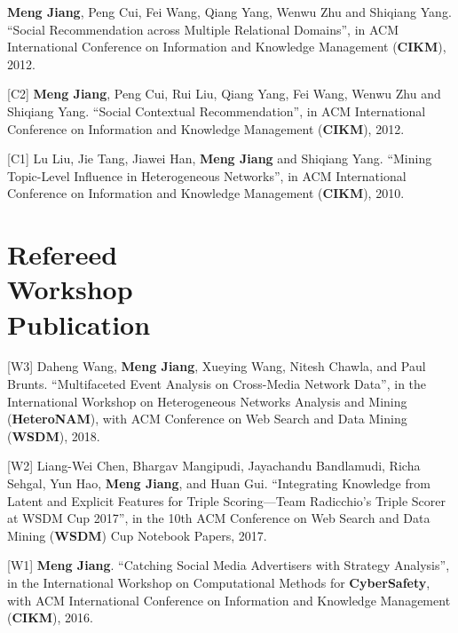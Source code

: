 \documentclass[margin, 9pt]{res}
\begin{document}
\begin{resume}
[C3] \textbf{Meng Jiang}, Peng Cui, Fei Wang, Qiang Yang, Wenwu Zhu and Shiqiang Yang. ``Social Recommendation across Multiple Relational Domains'', in ACM International Conference on Information and Knowledge Management (\textbf{CIKM}), 2012.

[C2] \textbf{Meng Jiang}, Peng Cui, Rui Liu, Qiang Yang, Fei Wang, Wenwu Zhu and Shiqiang Yang. ``Social Contextual Recommendation'', in ACM International Conference on Information and Knowledge Management (\textbf{CIKM}), 2012.

[C1] Lu Liu, Jie Tang, Jiawei Han, \textbf{Meng Jiang} and Shiqiang Yang. ``Mining Topic-Level Influence in Heterogeneous Networks'', in ACM International Conference on Information and Knowledge Management (\textbf{CIKM}), 2010.


\section{Refereed \\ Workshop \\ Publication}

[W3] Daheng Wang, \textbf{Meng Jiang}, Xueying Wang, Nitesh Chawla, and Paul Brunts. ``Multifaceted Event Analysis on Cross-Media Network Data'', in the International Workshop on Heterogeneous Networks Analysis and Mining (\textbf{HeteroNAM}), with ACM Conference on Web Search and Data Mining (\textbf{WSDM}), 2018.

[W2] Liang-Wei Chen, Bhargav Mangipudi, Jayachandu Bandlamudi, Richa Sehgal, Yun Hao, \textbf{Meng Jiang}, and Huan Gui. ``Integrating Knowledge from Latent and Explicit Features for Triple Scoring—Team Radicchio's Triple Scorer at WSDM Cup 2017'', in the 10th ACM Conference on Web Search and Data Mining (\textbf{WSDM}) Cup Notebook Papers, 2017.

[W1] \textbf{Meng Jiang}. ``Catching Social Media Advertisers with Strategy Analysis'', in the International Workshop on Computational Methods for \textbf{CyberSafety}, with ACM International Conference on Information and Knowledge Management (\textbf{CIKM}), 2016.



\end{resume}
\end{document}
